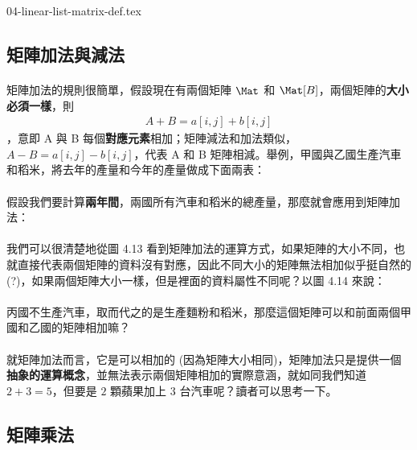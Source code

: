 \documentclass[12pt,a4paper,oneside]{report}
\begin{document}
\begin{CJK}{UTF8}{bkai}
{04-linear-list-matrix-def.tex}

\subsection{矩陣加法與減法}

\paragraph{}矩陣加法的規則很簡單，假設現在有兩個矩陣 $\Mat$ 和 $\Mat[B]$，兩個矩陣的\textbf{大小必須一樣}，則
\begin{align*}
A+B=a[i,j]+b[i,j]
\end{align*}
，意即 A 與 B 每個\textbf{對應元素}相加；矩陣減法和加法類似，$A-B=a[i,j]-b[i,j]$，代表 A 和 B 矩陣相減。舉例，甲國與乙國生產汽車和稻米，將去年的產量和今年的產量做成下面兩表：

\paragraph{}假設我們要計算\textbf{兩年間}，兩國所有汽車和稻米的總產量，那麼就會應用到矩陣加法：

\paragraph{}我們可以很清楚地從圖 4.13 看到矩陣加法的運算方式，如果矩陣的大小不同，也就直接代表兩個矩陣的資料沒有對應，因此不同大小的矩陣無法相加似乎挺自然的(?)，如果兩個矩陣大小一樣，但是裡面的資料屬性不同呢？以圖 4.14 來說：

\paragraph{}丙國不生產汽車，取而代之的是生產麵粉和稻米，那麼這個矩陣可以和前面兩個甲國和乙國的矩陣相加嘛？

\paragraph{}就矩陣加法而言，它是可以相加的 (因為矩陣大小相同)，矩陣加法只是提供一個\textbf{抽象的運算概念}，並無法表示兩個矩陣相加的實際意涵，就如同我們知道 $2+3=5$，但要是 $2$ 顆蘋果加上 $3$ 台汽車呢？讀者可以思考一下。

\subsection{矩陣乘法}


\end{CJK}
\end{document}
